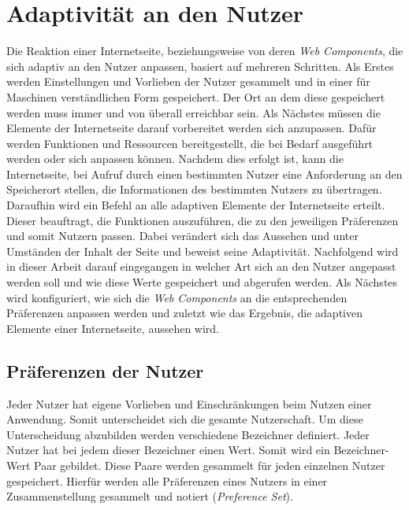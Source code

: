 \documentclass[12pt, paper=a4, bibtotoc, toc=listof, headsepline=true, numbers=endperiod]{scrreprt}
\begin{document}
\chapter{Adaptivität an den Nutzer}
Die Reaktion einer Internetseite, beziehungsweise von deren \emph{Web Components}, die sich adaptiv an den Nutzer anpassen, basiert auf mehreren Schritten. Als Erstes werden Einstellungen und Vorlieben der Nutzer gesammelt und in einer für Maschinen verständlichen Form gespeichert. Der Ort an dem diese gespeichert werden muss immer und von überall erreichbar sein. Als Nächstes müssen die Elemente der Internetseite darauf vorbereitet werden sich anzupassen. Dafür werden Funktionen und Ressourcen bereitgestellt, die bei Bedarf ausgeführt werden oder sich anpassen können. Nachdem dies erfolgt ist, kann die Internetseite, bei Aufruf durch einen bestimmten Nutzer eine Anforderung an den Speicherort stellen, die Informationen des bestimmten Nutzers zu übertragen. Daraufhin wird ein Befehl an alle adaptiven Elemente der Internetseite erteilt. Dieser beauftragt, die Funktionen auszuführen, die zu den jeweiligen Präferenzen und somit Nutzern passen. Dabei verändert sich das Aussehen und unter Umständen der Inhalt der Seite und beweist seine Adaptivität.\newline
Nachfolgend wird in dieser Arbeit darauf eingegangen in welcher Art sich an den Nutzer angepasst werden soll und wie diese Werte gespeichert und abgerufen werden. Als Nächstes wird konfiguriert, wie sich die \emph{Web Components} an die entsprechenden Präferenzen anpassen werden und zuletzt wie das Ergebnis, die adaptiven Elemente einer Internetseite, aussehen wird.
\section{Präferenzen der Nutzer}
Jeder Nutzer hat eigene Vorlieben und Einschränkungen beim Nutzen einer Anwendung. Somit unterscheidet sich die gesamte Nutzerschaft. Um diese Unterscheidung abzubilden werden verschiedene Bezeichner definiert. Jeder Nutzer hat bei jedem dieser Bezeichner einen Wert. Somit wird ein Bezeichner-Wert Paar gebildet. Diese Paare werden gesammelt für jeden einzelnen Nutzer gespeichert. Hierfür werden alle Präferenzen eines Nutzers in einer Zusammenstellung gesammelt und notiert (\emph{Preference Set}).
\end{document}
